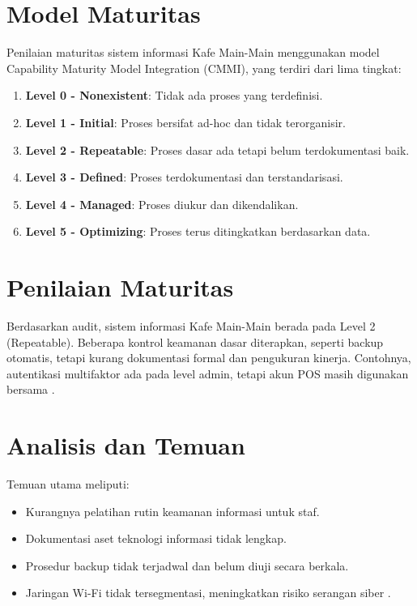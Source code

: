 \documentclass[12pt, a4paper]{report}
\begin{document}
\section{Model Maturitas}
Penilaian maturitas sistem informasi Kafe Main-Main menggunakan model Capability Maturity Model Integration (CMMI), yang terdiri dari lima tingkat:
\begin{enumerate}
    \item \textbf{Level 0 - Nonexistent}: Tidak ada proses yang terdefinisi.
    \item \textbf{Level 1 - Initial}: Proses bersifat ad-hoc dan tidak terorganisir.
    \item \textbf{Level 2 - Repeatable}: Proses dasar ada tetapi belum terdokumentasi baik.
    \item \textbf{Level 3 - Defined}: Proses terdokumentasi dan terstandarisasi.
    \item \textbf{Level 4 - Managed}: Proses diukur dan dikendalikan.
    \item \textbf{Level 5 - Optimizing}: Proses terus ditingkatkan berdasarkan data.
\end{enumerate}

\section{Penilaian Maturitas}
Berdasarkan audit, sistem informasi Kafe Main-Main berada pada Level 2 (Repeatable). Beberapa kontrol keamanan dasar diterapkan, seperti backup otomatis, tetapi kurang dokumentasi formal dan pengukuran kinerja. Contohnya, autentikasi multifaktor ada pada level admin, tetapi akun POS masih digunakan bersama \citep{widodo2022keamanan, sari2023backup}.

\section{Analisis dan Temuan}
Temuan utama meliputi:
\begin{itemize}
    \item Kurangnya pelatihan rutin keamanan informasi untuk staf.
    \item Dokumentasi aset teknologi informasi tidak lengkap.
    \item Prosedur backup tidak terjadwal dan belum diuji secara berkala.
    \item Jaringan Wi-Fi tidak tersegmentasi, meningkatkan risiko serangan siber \citep{haryanto2021wifi}.
\end{itemize}
\end{document}
